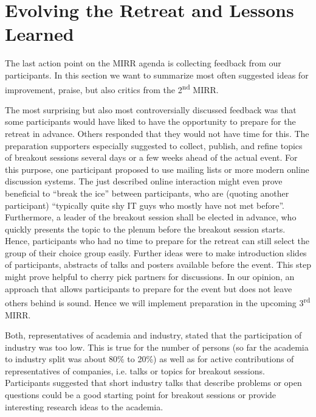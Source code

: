 \section{Evolving the Retreat and Lessons Learned} \label{sec:evolution}

The last action point on the MIRR agenda is collecting feedback from our participants. In this section we want to summarize most often suggested ideas for improvement, praise, but also critics from the 2\textsuperscript{nd} \ac{MIRR}.

The most surprising but also most controversially discussed feedback was that some participants would have liked to have the opportunity to prepare for the retreat in advance. Others responded that they would not have time for this.
The preparation supporters especially suggested to collect, publish, and refine topics of breakout sessions several days or a few weeks ahead of the actual event. For this purpose, one participant proposed to use mailing lists or more modern online discussion systems. The just described online interaction might even prove beneficial to ``break the ice'' between participants, who are (quoting another participant) ``typically quite shy IT guys who mostly have not met before''.
Furthermore, a leader of the breakout session shall be elected in advance, who quickly presents the topic to the plenum before the breakout session starts. Hence, participants who had no time to prepare for the retreat can still select the group of their choice group easily.
Further ideas were to make introduction slides of participants, abstracts of talks and posters available before the event. This step might prove helpful to cherry pick partners for discussions.
In our opinion, an approach that allows participants to prepare for the event but does not leave others behind is sound. Hence we will implement preparation in the upcoming 3\textsuperscript{rd} \ac{MIRR}.

Both, representatives of academia and industry, stated that the participation of industry was too low. This is true for the number of persons (so far the academia to industry split was about 80\% to 20\%) as well as for active contributions of representatives of companies, i.e. talks or topics for breakout sessions. Participants suggested that short industry talks that describe problems or open questions could be a good starting point for breakout sessions or provide interesting research ideas to the academia.

